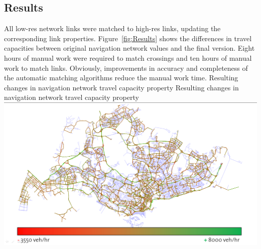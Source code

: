\subsection{Results}
All low-res network links were matched to high-res links, updating the corresponding link properties. Figure~\ref{fig:Results} shows the differences in travel capacities between original navigation network values and the final version. Eight hours of manual work were required to match crossings and ten hours of manual work to match links. Obviously, improvements in accuracy and completeness of the automatic matching algorithms reduce the manual work time.
%
\createfigure
{Resulting changes in navigation network travel capacity property}
{Resulting changes in navigation network travel capacity property}
{\label{fig:Results}}
{\includegraphics[width=1.0\textwidth]{extending/figures/netEdSing/Result.png}}
{}

